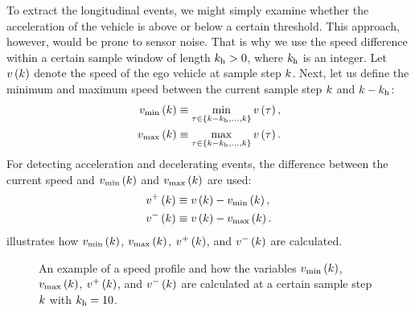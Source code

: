 \cstarta To extract the longitudinal events, we might simply examine whether the acceleration of the vehicle is above or below a certain threshold. 
This approach, however, would be prone to sensor noise. 
That is why we use the speed difference within a certain sample window of length $k_{\mathrm{h}}>0$, where $k_{\mathrm{h}}$ is an integer.
Let $v\left(k\right)$ denote the speed of the ego vehicle at sample step $k$. 
Next, let us define the minimum and maximum speed between the current sample step $k$ and $k-k_{\mathrm{h}}$:
\begin{align}
	v_\mathrm{min}\left(k\right) &\equiv \min_{\tau \in \left\{ k-k_{\mathrm{h}}, \ldots, k \right\} } v\left(\tau\right), \\
	v_\mathrm{max}\left(k\right) &\equiv \max_{\tau \in \left\{ k-k_{\mathrm{h}}, \ldots, k \right\} } v\left(\tau\right).
\end{align}\cenda
For detecting acceleration and decelerating events, the difference between the current speed and $v_\mathrm{min}\left(k\right)$ and $v_\mathrm{max}\left(k\right)$ are used:
\begin{align}
	v^{+}\left(k\right) &\equiv v\left(k\right) - v_\mathrm{min}\left(k\right),\\
	v^{-}\left(k\right) &\equiv v\left(k\right) - v_\mathrm{max}\left(k\right).
\end{align}
\cstartd {} illustrates how $v_\mathrm{min}\left(k\right)$, $v_\mathrm{max}\left(k\right)$, $v^{+}\left(k\right)$, and $v^{-}\left(k\right)$ are calculated.
\cendd

\setlength{\figurewidth}{.9\linewidth}
\setlength{\figureheight}{.6\linewidth}
\begin{figure}
	\centering
	
	\caption{\cstartd An example of a speed profile and how the variables $v_\mathrm{min}\left(k\right)$, $v_\mathrm{max}\left(k\right)$, $v^{+}\left(k\right)$, and $v^{-}\left(k\right)$ are calculated at a certain sample step $k$ with $k_{\mathrm{h}}=10$.\cendd}
	\label{fig:explain symbols}
\end{figure}

